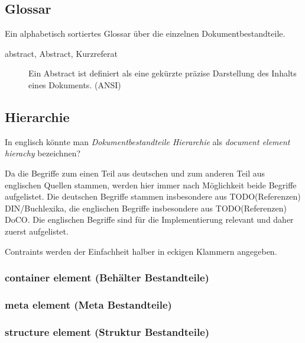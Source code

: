 \subsection{Glossar}

Ein alphabetisch sortiertes Glossar über die einzelnen Dokumentbestandteile.

\begin{multicols}{2}
  \begin{description}
    \item[abstract, Abstract, Kurzreferat]
    Ein Abstract ist definiert als eine gekürzte präzise Darstellung des Inhalts eines Dokuments. (ANSI)
  \end{description}
\end{multicols}

\subsection{Hierarchie}

In englisch könnte man \emph{Dokumentbestandteile Hierarchie} als
\emph{document element hierachy} bezeichnen?

Da die Begriffe zum einen Teil aus deutschen und zum anderen Teil aus englischen Quellen
stammen, werden hier immer nach Möglichkeit beide Begriffe aufgelistet.
Die deutschen Begriffe stammen insbesondere aus TODO(Referenzen) DIN/Buchlexika,
die englischen Begriffe insbesondere aus TODO(Referenzen) DoCO.
Die englischen Begriffe sind für die Implementierung relevant und daher zuerst aufgelistet.

Contraints werden der Einfachheit halber in eckigen Klammern angegeben.

\subsubsection{container element (Behälter Bestandteile)}



\subsubsection{meta element (Meta Bestandteile)}



\subsubsection{structure element (Struktur Bestandteile)}

